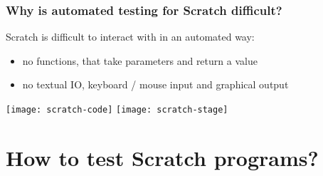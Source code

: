 \begin{frame}
\end{frame}

\begin{frame}\frametitle{Why is automated testing for Scratch difficult?}
    Scratch is difficult to interact with in an automated way:
    \begin{itemize}
        \item \textcolor{upfim}{no functions}, that take parameters and return a value
        \item \textcolor{upfim}{no textual IO}, keyboard / mouse input and graphical output
    \end{itemize}

    \bigskip

    \centering
    \texttt{[image: scratch-code]}
    \hspace{1em}
    \texttt{[image: scratch-stage]}
\end{frame}

\section{How to test Scratch programs?}

\begin{frame}
\end{frame}

